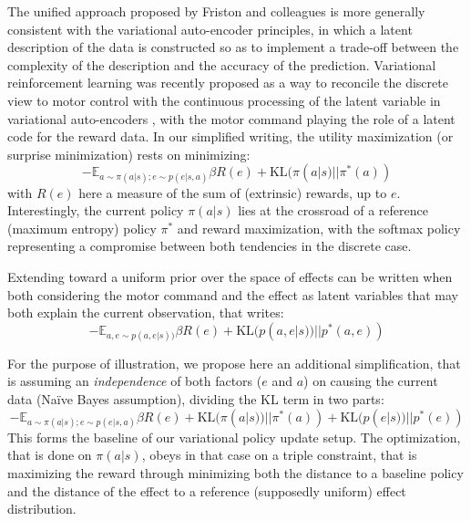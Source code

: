 \documentclass[runningheads]{llncs}
\begin{document}
The unified approach proposed by Friston and colleagues is more generally consistent with the variational auto-encoder principles, in which a latent description of the data is constructed so as to implement a trade-off between the complexity of the description and the accuracy of the prediction. Variational reinforcement learning was recently proposed as a way to reconcile the discrete view to motor control with the continuous processing of the latent variable in variational auto-encoders \cite{levine2013guided,fox2015taming,haarnoja2017reinforcement}, with the motor command playing the role of a latent code for the reward data.  In our simplified writing, the utility maximization (or surprise minimization) rests on minimizing:
\begin{equation}
-\mathbb{E}_{a\sim \pi(a|s); e\sim p(e|s,a)} \beta R(e) + \text{KL}(\pi(a|s)||\pi^*(a)) 
\end{equation}
with $R(e)$ here a measure of the sum of (extrinsic) rewards, up to $e$. Interestingly, the current policy $\pi(a|s)$ lies at the crossroad of a reference (maximum entropy) policy $\pi^*$ and reward maximization, with the softmax policy representing a compromise between both tendencies in the discrete case. 

Extending toward a uniform prior over the space of effects can be written when both considering the motor command and the effect as latent variables that may both explain the current observation, that writes:
\begin{equation}
-\mathbb{E}_{a, e\sim p(a,e|s))} \beta R(e) + \text{KL}(p(a,e|s))||p^*(a,e)) 
\end{equation}   

For the purpose of illustration, we propose here an additional simplification, that is assuming an \emph{independence} of both factors ($e$ and $a$) on causing the current data (Naïve Bayes assumption), dividing the KL term in two parts:
\begin{equation}
-\mathbb{E}_{a\sim \pi(a|s); e\sim p(e|s,a)} \beta R(e) + \text{KL}(\pi(a|s))||\pi^*(a)) + \text{KL}(p(e|s))||p^*(e))
\end{equation}   
This forms the baseline of our variational policy update setup. The optimization, that is done on $\pi(a|s)$, obeys in that case on a triple constraint, that is maximizing the reward through minimizing both the distance to a baseline policy and the distance of the effect to a reference (supposedly uniform) effect distribution.
\end{document}
